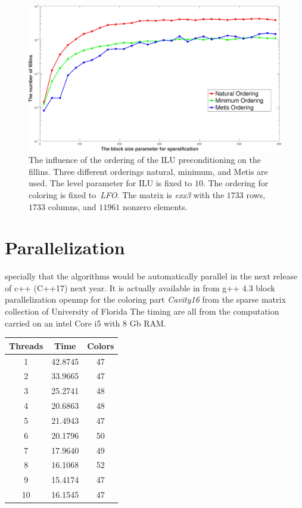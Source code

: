\documentclass[12pt, oneside]{book}
\begin{document}
\begin{figure}
\centering
\includegraphics[width=0.9\linewidth]{fillin_blocksize.jpg}
\caption{The influence of the ordering of the ILU preconditioning 
on the fillins. 
Three different orderings natural, minimum, and Metis are used.
The level parameter for ILU is fixed to $10$. 
The ordering for coloring is fixed to~\textit{LFO}.
The matrix is \textit{exx3} with the $1733$ rows,
$1733$ columns, and $11961$ nonzero elements.}
\label{fillin_blocksize}
\end{figure}



\section{Parallelization}
\label{s.parallel}

\cite{mpi_greedy_coloring}

specially that the algorithms would be automatically parallel in the next
release of c++ (C++17) next year.
It is actually available in from g++ 4.3 
\cite{parallelcpp}
block parallelization openmp for the coloring part
\cite{Rokos2015}
\textit{Cavity16} from the sparse matrix collection of University of Florida 
The timing are all from the computation carried on 
an intel Core i5 with 8 Gb RAM. 
\begin{tabular}{|c|c|c|}
\hline
Threads & Time & Colors \\\hline
1 & 42.8745 & 47 \\\hline
2 & 33.9665 & 47 \\\hline
3 & 25.2741 & 48 \\\hline
4 & 20.6863 & 48 \\\hline
5 & 21.4943 & 47 \\\hline
6 & 20.1796 & 50 \\\hline
7 & 17.9640 & 49 \\\hline
8 & 16.1068 & 52 \\\hline
9 & 15.4174 & 47 \\\hline
10 & 16.1545 & 47 \\\hline
\end{tabular}
\end{document}
